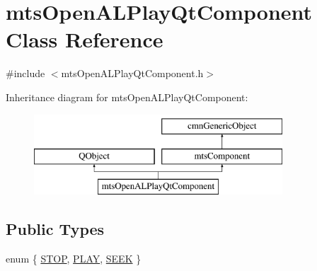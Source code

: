 \hypertarget{classmts_open_a_l_play_qt_component}{}\section{mts\+Open\+A\+L\+Play\+Qt\+Component Class Reference}
\label{classmts_open_a_l_play_qt_component}


{\ttfamily \#include $<$mts\+Open\+A\+L\+Play\+Qt\+Component.\+h$>$}

Inheritance diagram for mts\+Open\+A\+L\+Play\+Qt\+Component\+:\begin{figure}[H]
\begin{center}
\leavevmode
\includegraphics[height=3.000000cm]{d0/d37/classmts_open_a_l_play_qt_component}
\end{center}
\end{figure}
\subsection*{Public Types}
\begin{DoxyCompactItemize}
\item 
enum \{ \hyperlink{classmts_open_a_l_play_qt_component_a3e6e035e14fb444c08fddef403f04420a4f8405fd97075c94a709704540a2a040}{S\+T\+O\+P}, 
\hyperlink{classmts_open_a_l_play_qt_component_a3e6e035e14fb444c08fddef403f04420a54bb34d81134957005002104220ee8f3}{P\+L\+A\+Y}, 
\hyperlink{classmts_open_a_l_play_qt_component_a3e6e035e14fb444c08fddef403f04420aca7c13ac68f726a977dc35ebd023363e}{S\+E\+E\+K}
 \}
\end{DoxyCompactItemize}

